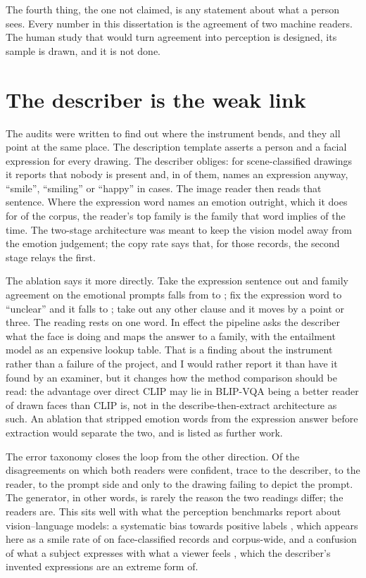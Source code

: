 The fourth thing, the one not claimed, is any statement about what a person sees. Every number in this dissertation is the agreement of two machine readers. The human study that would turn agreement into perception is designed, its sample is drawn, and it is not done.

\section{The describer is the weak link}
\label{sec:disc-describer}

The audits were written to find out where the instrument bends, and they all point at the same place. The description template asserts a person and a facial expression for every drawing. The describer obliges: for \DescScenePeopleZero{} scene-classified drawings it reports that nobody is present and, in \DescScenePeopleZeroExpr{} of them, names an expression anyway, ``smile'', ``smiling'' or ``happy'' in \DescSceneSmile{} cases. The image reader then reads that sentence. Where the expression word names an emotion outright, which it does for \DescBareStrictPct{} of the corpus, the reader's top family is the family that word implies \DescCopyStrict{} of the time. The two-stage architecture was meant to keep the vision model away from the emotion judgement; the copy rate says that, for those records, the second stage relays the first.

The ablation says it more directly. Take the expression sentence out and family agreement on the emotional prompts falls from \FullEmoFamObs{} to \AblDropExpressionEmoFamObs{}; fix the expression word to ``unclear'' and it falls to \AblFixedExpressionEmoFamObs{}; take out any other clause and it moves by a point or three. The reading rests on one word. In effect the pipeline asks the describer what the face is doing and maps the answer to a family, with the entailment model as an expensive lookup table. That is a finding about the instrument rather than a failure of the project, and I would rather report it than have it found by an examiner, but it changes how the method comparison should be read: the advantage over direct CLIP may lie in BLIP-VQA being a better reader of drawn faces than CLIP is, not in the describe-then-extract architecture as such. An ablation that stripped emotion words from the expression answer before extraction would separate the two, and is listed as further work.

The error taxonomy closes the loop from the other direction. Of the \TaxN{} disagreements on which both readers were confident, \TaxDescriber{} trace to the describer, \TaxReader{} to the reader, \TaxPrompt{} to the prompt side and only \TaxGenerator{} to the drawing failing to depict the prompt. The generator, in other words, is rarely the reason the two readings differ; the readers are. This sits well with what the perception benchmarks report about vision--language models: a systematic bias towards positive labels \cite{bhattacharyya2025evaluating}, which appears here as a smile rate of \DescSmileFace{} on face-classified records and \DescSmileAll{} corpus-wide, and a confusion of what a subject expresses with what a viewer feels \cite{gao2025eemo}, which the describer's invented expressions are an extreme form of.

